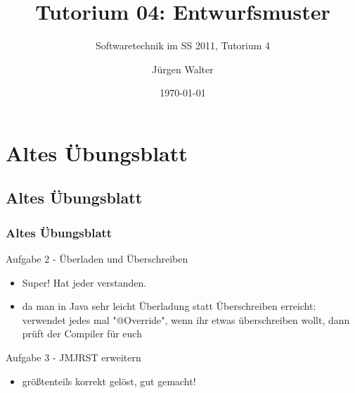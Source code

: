 

\title[Tutorium04]{Tutorium 04: Entwurfsmuster}
\subtitle{Softwaretechnik im SS 2011, Tutorium 4}
\author{Jürgen Walter}
\date{\today}




\begin{frame}
\titlepage
\end{frame}


\section{Altes Übungsblatt}

\subsection{Altes Übungsblatt}


\begin{frame}[fragile]
\frametitle{Altes Übungsblatt}
	\begin{block}{Aufgabe 2 - Überladen und Überschreiben}
	\begin{itemize}
	\item Super! Hat jeder verstanden.
	\item da man in Java sehr leicht Überladung statt Überschreiben erreicht: \\
		verwendet jedes mal "@Override", wenn ihr etwas überschreiben wollt, dann prüft der Compiler für euch
	\end{itemize}
	\end{block}
	\pause
	\begin{block}{Aufgabe 3 - JMJRST erweitern} 
	\begin{itemize}
	\item größtenteils korrekt gelöst, gut gemacht!
	\end{itemize}
	\end{block}
\end{frame}

